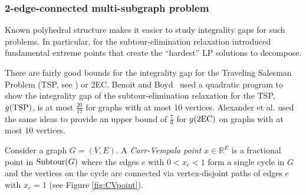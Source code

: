 \subsubsection{2-edge-connected multi-subgraph problem}
\label{sec:2EC-intro}
Known polyhedral structure makes it easier to study integrality gaps for such problems. In particular, for the subtour-elimination relaxation \cite{carrravi,boydcarr,Carr2004} introduced fundamental extreme points that create the ``hardest'' LP solutions to decompose.

There are fairly good bounds for the integrality gap for the Traveling Salesman Problem (TSP, see \cite{tspbook}) or 2EC.
Benoit and Boyd~\cite{TSPcompute} used a quadratic program to show the integrality gap of the subtour-elimination relaxation for the TSP, $g(\operatorname{{{TSP}}})$, is at most $\frac{20}{17}$ for graphs with at most 10 vertices. Alexander et al. \cite{alexander2006integrality} used the same ideas to provide an upper bound of $\frac{7}{6}$ for $g(\2ec)$ on graphs with at most 10 vertices. 

Consider a graph $G=(V,E)$. A \textit{Carr-Vempala point} $x\in \mathbb{R}^E$ is a fractional point in $\operatorname{{Subtour}}(G)$ where the edges $e$ with $0<x_e<1$ form a single cycle in $G$ and the vertices on the cycle are connected via vertex-disjoint paths of edges $e$ with $x_e =1$ (see Figure \ref{fig:CVpoint}).


